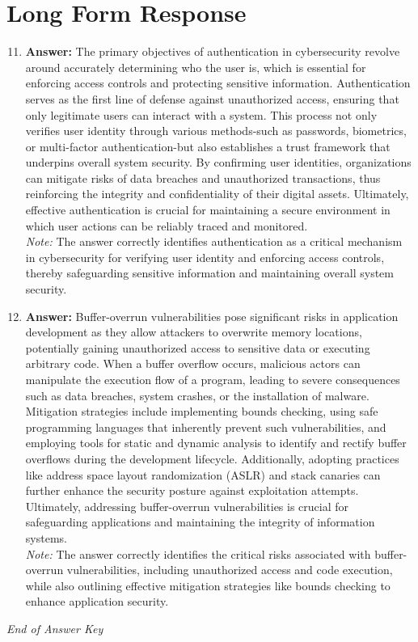 \documentclass[12pt]{article}
\begin{document}
\section*{Long Form Response}
\begin{enumerate}[label=\arabic*.]
\setcounter{enumi}{10}
\item \textbf{Answer:} The primary objectives of authentication in cybersecurity revolve around accurately determining who the user is, which is essential for enforcing access controls and protecting sensitive information. Authentication serves as the first line of defense against unauthorized access, ensuring that only legitimate users can interact with a system. This process not only verifies user identity through various methods-such as passwords, biometrics, or multi-factor authentication-but also establishes a trust framework that underpins overall system security. By confirming user identities, organizations can mitigate risks of data breaches and unauthorized transactions, thus reinforcing the integrity and confidentiality of their digital assets. Ultimately, effective authentication is crucial for maintaining a secure environment in which user actions can be reliably traced and monitored.
\\ \textit{Note:} The answer correctly identifies authentication as a critical mechanism in cybersecurity for verifying user identity and enforcing access controls, thereby safeguarding sensitive information and maintaining overall system security.
\item \textbf{Answer:} Buffer-overrun vulnerabilities pose significant risks in application development as they allow attackers to overwrite memory locations, potentially gaining unauthorized access to sensitive data or executing arbitrary code. When a buffer overflow occurs, malicious actors can manipulate the execution flow of a program, leading to severe consequences such as data breaches, system crashes, or the installation of malware. Mitigation strategies include implementing bounds checking, using safe programming languages that inherently prevent such vulnerabilities, and employing tools for static and dynamic analysis to identify and rectify buffer overflows during the development lifecycle. Additionally, adopting practices like address space layout randomization (ASLR) and stack canaries can further enhance the security posture against exploitation attempts. Ultimately, addressing buffer-overrun vulnerabilities is crucial for safeguarding applications and maintaining the integrity of information systems.
\\ \textit{Note:} The answer correctly identifies the critical risks associated with buffer-overrun vulnerabilities, including unauthorized access and code execution, while also outlining effective mitigation strategies like bounds checking to enhance application security.
\end{enumerate}

\vfill
\noindent\textit{End of Answer Key}
\end{document}
